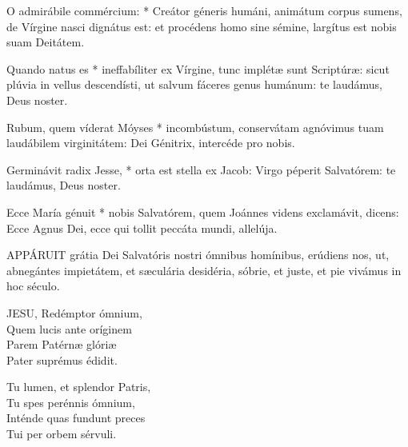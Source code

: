 

\sectionornament






 O admirábile commércium: * Creátor géneris humáni, animátum corpus sumens, de Vírgine nasci dignátus est: et procédens homo sine sémine, largítus est nobis suam Deitátem.


 Quando natus es * ineffabíliter ex Vírgine, tunc implétæ sunt Scriptúræ: sicut plúvia in vellus descendísti, ut salvum fáceres genus humánum: te laudámus, Deus noster.

 Rubum, quem víderat Móyses * incombústum, conservátam agnóvimus tuam laudábilem virginitátem: Dei Génitrix, intercéde pro nobis.

 Germinávit radix Jesse, * orta est stella ex Jacob: Virgo péperit Salvatórem: te laudámus, Deus noster.

 Ecce María génuit * nobis Salvatórem, quem Joánnes videns exclamávit, dicens: Ecce Agnus Dei, ecce qui tollit peccáta mundi, allelúja.


\lettrine[lines=2]{A}{PPÁRUIT} grátia Dei Salvatóris nostri ómnibus homínibus, erúdiens nos, ut, abnegántes impietátem, et sæculária desidéria, sóbrie, et juste, et pie vivámus in hoc século.


\lettrine[lines=2]{J}{ESU}, Redémptor ómnium,\\
Quem lucis ante oríginem\\
Parem Patérnæ glóriæ\\
Pater suprémus édidit.

Tu lumen, et splendor Patris,\\
Tu spes perénnis ómnium,\\
Inténde quas fundunt preces\\
Tui per orbem sérvuli.


